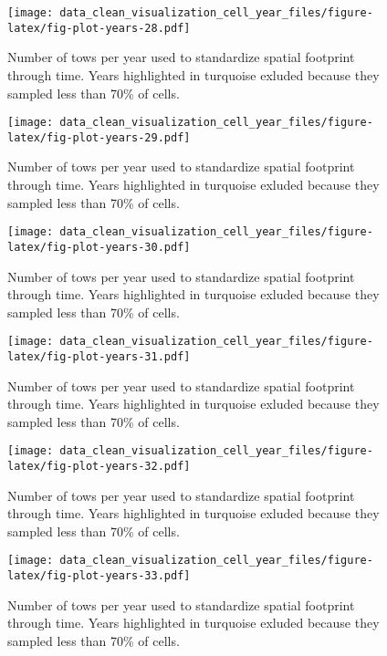 \documentclass[
]{article}
\begin{document}
\begin{figure}
\centering
\texttt{[image: data\_clean\_visualization\_cell\_year\_files/figure-latex/fig-plot-years-28.pdf]}
\caption{\label{fig:fig-plot-years-28}Number of tows per year used to standardize spatial footprint through time. Years highlighted in turquoise exluded because they sampled less than 70\% of cells.}
\end{figure}

\begin{figure}
\centering
\texttt{[image: data\_clean\_visualization\_cell\_year\_files/figure-latex/fig-plot-years-29.pdf]}
\caption{\label{fig:fig-plot-years-29}Number of tows per year used to standardize spatial footprint through time. Years highlighted in turquoise exluded because they sampled less than 70\% of cells.}
\end{figure}

\begin{figure}
\centering
\texttt{[image: data\_clean\_visualization\_cell\_year\_files/figure-latex/fig-plot-years-30.pdf]}
\caption{\label{fig:fig-plot-years-30}Number of tows per year used to standardize spatial footprint through time. Years highlighted in turquoise exluded because they sampled less than 70\% of cells.}
\end{figure}

\begin{figure}
\centering
\texttt{[image: data\_clean\_visualization\_cell\_year\_files/figure-latex/fig-plot-years-31.pdf]}
\caption{\label{fig:fig-plot-years-31}Number of tows per year used to standardize spatial footprint through time. Years highlighted in turquoise exluded because they sampled less than 70\% of cells.}
\end{figure}

\begin{figure}
\centering
\texttt{[image: data\_clean\_visualization\_cell\_year\_files/figure-latex/fig-plot-years-32.pdf]}
\caption{\label{fig:fig-plot-years-32}Number of tows per year used to standardize spatial footprint through time. Years highlighted in turquoise exluded because they sampled less than 70\% of cells.}
\end{figure}

\begin{figure}
\centering
\texttt{[image: data\_clean\_visualization\_cell\_year\_files/figure-latex/fig-plot-years-33.pdf]}
\caption{\label{fig:fig-plot-years-33}Number of tows per year used to standardize spatial footprint through time. Years highlighted in turquoise exluded because they sampled less than 70\% of cells.}
\end{figure}
\end{document}
